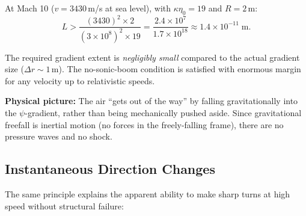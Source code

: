 \documentclass[11pt]{article}
\begin{document}
\begin{tcolorbox}[colback=green!5,colframe=green!50!black,title=
  Critical Prediction: No Sonic Boom]
At Mach 10 ($v = 3430$\,m/s at sea level), with $\kappa\eta_0 = 19$
and $R = 2$\,m:
\begin{equation}
L > \frac{(3430)^2 \times 2}{(3 \times 10^8)^2 \times 19}
  = \frac{2.4 \times 10^7}{1.7 \times 10^{18}}
  \approx 1.4 \times 10^{-11}\;\text{m}.
\end{equation}

The required gradient extent is \emph{negligibly small} compared to the
actual gradient size ($\Delta r \sim 1$\,m). The no-sonic-boom condition
is satisfied with enormous margin for any velocity up to relativistic
speeds.

\textbf{Physical picture:} The air ``gets out of the way'' by falling
gravitationally into the $\psi$-gradient, rather than being mechanically
pushed aside. Since gravitational freefall is inertial motion (no forces
in the freely-falling frame), there are no pressure waves and no shock.
\end{tcolorbox}

\subsection{Instantaneous Direction Changes}

The same principle explains the apparent ability to make sharp turns at
high speed without structural failure:
\end{document}
